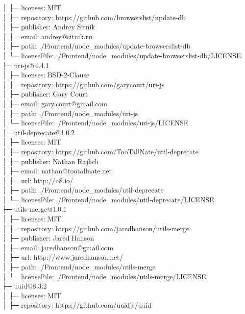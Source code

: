 │  ├─ licenses: MIT\\
│  ├─ repository: https://github.com/browserslist/update-db\\
│  ├─ publisher: Andrey Sitnik\\
│  ├─ email: andrey@sitnik.ru\\
│  ├─ path: ./Frontend/node\_modules/update-browserslist-db\\
│  └─ licenseFile: ./Frontend/node\_modules/update-browserslist-db/LICENSE\\
├─ uri-js@4.4.1\\
│  ├─ licenses: BSD-2-Clause\\
│  ├─ repository: https://github.com/garycourt/uri-js\\
│  ├─ publisher: Gary Court\\
│  ├─ email: gary.court@gmail.com\\
│  ├─ path: ./Frontend/node\_modules/uri-js\\
│  └─ licenseFile: ./Frontend/node\_modules/uri-js/LICENSE\\
├─ util-deprecate@1.0.2\\
│  ├─ licenses: MIT\\
│  ├─ repository: https://github.com/TooTallNate/util-deprecate\\
│  ├─ publisher: Nathan Rajlich\\
│  ├─ email: nathan@tootallnate.net\\
│  ├─ url: http://n8.io/\\
│  ├─ path: ./Frontend/node\_modules/util-deprecate\\
│  └─ licenseFile: ./Frontend/node\_modules/util-deprecate/LICENSE\\
├─ utils-merge@1.0.1\\
│  ├─ licenses: MIT\\
│  ├─ repository: https://github.com/jaredhanson/utils-merge\\
│  ├─ publisher: Jared Hanson\\
│  ├─ email: jaredhanson@gmail.com\\
│  ├─ url: http://www.jaredhanson.net/\\
│  ├─ path: ./Frontend/node\_modules/utils-merge\\
│  └─ licenseFile: ./Frontend/node\_modules/utils-merge/LICENSE\\
├─ uuid@8.3.2\\
│  ├─ licenses: MIT\\
│  ├─ repository: https://github.com/uuidjs/uuid\\
